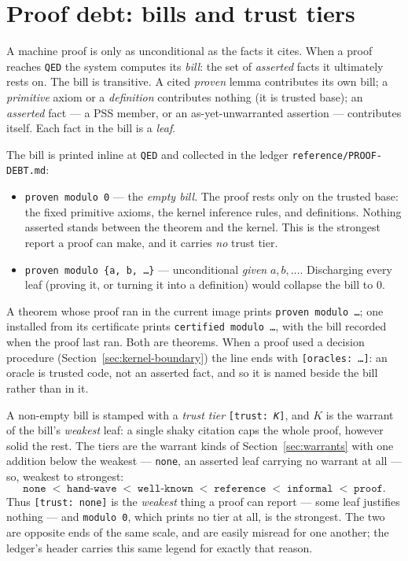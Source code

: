 \section{Proof debt: bills and trust tiers}
\label{sec:proof-debt}

A machine proof is only as unconditional as the facts it cites.  When a
proof reaches \texttt{QED} the system computes its \emph{bill}: the set of
\emph{asserted} facts it ultimately rests on.  The bill is transitive.  A
cited \emph{proven} lemma contributes its own bill; a \emph{primitive}
axiom or a \emph{definition} contributes nothing (it is trusted base); an
\emph{asserted} fact --- a PSS member, or an as-yet-unwarranted assertion
--- contributes itself.  Each fact in the bill is a \emph{leaf}.

The bill is printed inline at \texttt{QED} and collected in the ledger
\texttt{reference/PROOF-DEBT.md}:

\begin{itemize}
\item \texttt{proven modulo 0} --- the \emph{empty bill}.  The proof rests
  only on the trusted base: the fixed primitive axioms, the kernel
  inference rules, and definitions.  Nothing asserted stands between the
  theorem and the kernel.  This is the strongest report a proof can make,
  and it carries \emph{no} trust tier.
\item \texttt{proven modulo \{a, b, \ldots\}} --- unconditional
  \emph{given} $a, b, \ldots$.  Discharging every leaf (proving it, or
  turning it into a definition) would collapse the bill to $0$.
\end{itemize}

\noindent
A theorem whose proof ran in the current image prints
\texttt{proven modulo \ldots}; one installed from its certificate prints
\texttt{certified modulo \ldots}, with the bill recorded when the proof
last ran.  Both are theorems.  When a proof used a decision procedure
(Section~\ref{sec:kernel-boundary}) the line ends with
\texttt{[oracles: \ldots]}: an oracle is trusted code, not an asserted
fact, and so it is named beside the bill rather than in it.

\noindent
A non-empty bill is stamped with a \emph{trust tier}
\texttt{[trust:\ \textit{K}]}, and $K$ is the warrant of the bill's
\emph{weakest} leaf: a single shaky citation caps the whole proof, however
solid the rest.  The tiers are the warrant kinds of
Section~\ref{sec:warrants} with one addition below the weakest ---
\texttt{none}, an asserted leaf carrying no warrant at all --- so, weakest
to strongest:
\[
  \texttt{none} \;<\; \texttt{hand-wave} \;<\; \texttt{well-known}
  \;<\; \texttt{reference} \;<\; \texttt{informal} \;<\; \texttt{proof}.
\]
Thus \texttt{[trust:\ none]} is the \emph{weakest} thing a proof can
report --- some leaf justifies nothing --- and \texttt{modulo 0}, which
prints no tier at all, is the strongest.  The two are opposite ends of the
same scale, and are easily misread for one another; the ledger's header
carries this same legend for exactly that reason.

